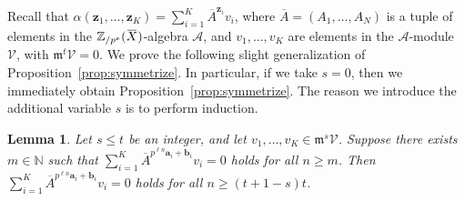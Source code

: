 \documentclass[letterpaper, 11pt, thm-restate]{article}
\numberwithin{equation}{section}
\newcommand{\N}{\mathbb{N}}
\newcommand{\Zpe}{\mathbb{Z}_{/p^e}}
\newcommand{\mV}{\mathcal{V}}
\newcommand{\mA}{\mathcal{A}}
\newcommand{\ba}{\boldsymbol{a}}
\newcommand{\bb}{\boldsymbol{b}}
\newcommand{\bz}{\boldsymbol{z}}
\newcommand{\oX}{\mkern 1.5mu\overline{\mkern-1.5mu X \mkern-1.5mu}\mkern 1.5mu}
\newcommand{\oA}{\overline{A}}
\newcommand{\frm}{\mathfrak{m}}
\newtheorem{lem}[thrm]{Lemma}
\theoremstyle{definition}
\theoremstyle{definition}
\theoremstyle{definition}
\begin{document}
Recall that $\alpha(\bz_1, \ldots, \bz_K) = \sum_{i = 1}^K \oA^{\bz_i} v_i$, where $\oA = (A_1, \ldots, A_N)$ is a tuple of elements in the $\Zpe(\oX)$-algebra $\mA$, and $v_1, \ldots, v_K$ are elements in the $\mA$-module $\mV$, with $\frm^t \mV = 0$.
We prove the following slight generalization of Proposition~\ref{prop:symmetrize}.
In particular, if we take $s = 0$, then we immediately obtain Proposition~\ref{prop:symmetrize}.
The reason we introduce the additional variable $s$ is to perform induction.

\begin{lem}\label{lem:syminduction}
    Let $s \leq t$ be an integer, and let $v_1, \ldots, v_K \in \frm^{s}\mV$. 
    Suppose there exists $m \in \N$ such that $\sum_{i = 1}^K \oA^{p^{\ell n} \ba_i + \bb_i} v_i = 0$ holds for all $n \geq m$. Then $\sum_{i = 1}^K \oA^{p^{\ell n} \ba_i + \bb_i} v_i = 0$ holds for all $n \geq (t+1-s)t$.
\end{lem}
\end{document}

